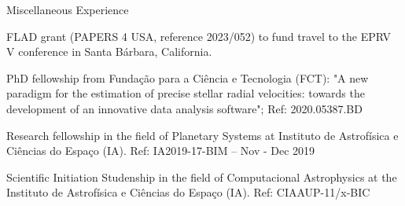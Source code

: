 
\begin{rubric}{Miscellaneous Experience}









\entry*[\dates{2023/02}]
	FLAD grant (PAPERS 4 USA, reference 2023/052) to fund travel to the EPRV V conference in Santa Bárbara, California.

	PhD fellowship from Fundação para a Ciência e Tecnologia (FCT): "A new paradigm for the estimation of precise stellar radial velocities: towards the development of an innovative data analysis software"; Ref: 2020.05387.BD

\entry*[\dates{2019-11/2019-12}]
	Research fellowship in the field of Planetary Systems at Instituto de Astrofísica e Ciências do Espaço (IA).  Ref: IA2019-17-BIM -- Nov - Dec 2019 

\entry*[\dates{2019-04/2019-09}]
	Scientific Initiation Studenship  in the field of Computacional Astrophysics at the Instituto de Astrofísica e Ciências do Espaço (IA).  Ref: CIAAUP-11/x-BIC 


\end{rubric}